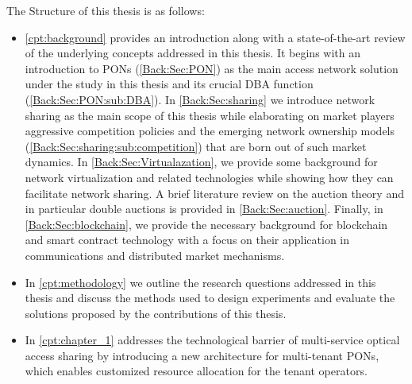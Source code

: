 The Structure of this thesis is as follows:
    \begin{itemize}
    \item \autoref{cpt:background} provides an introduction along with a state-of-the-art review of the underlying concepts addressed in this thesis. It begins with an introduction to \acp{PON} (\autoref{Back:Sec:PON}) as the main access network solution under the study in this thesis and its crucial \ac{DBA} function (\autoref{Back:Sec:PON:sub:DBA}). In \autoref{Back:Sec:sharing} we introduce network sharing as the main scope of this thesis while elaborating on market players aggressive competition policies and the emerging network ownership models (\autoref{Back:Sec:sharing:sub:competition}) that are born out of such market dynamics. 
    In \autoref{Back:Sec:Virtualazation}, we provide some background for network virtualization and related technologies while showing how they can facilitate network sharing. A brief literature review on the auction theory and in particular double auctions is provided in \autoref{Back:Sec:auction}. Finally, in \autoref{Back:Sec:blockchain}, we provide the necessary background for blockchain and smart contract technology with a focus on their application in communications and distributed market mechanisms. 
    
    \item In \autoref{cpt:methodology} we outline the research questions addressed in this thesis and discuss the methods used to design experiments and evaluate the solutions proposed by the contributions of this thesis. 
    
    \item In \autoref{cpt:chapter_1} addresses the technological barrier of multi-service optical access sharing by introducing a new architecture for multi-tenant \acp{PON}, which enables customized resource allocation for the tenant operators.
    

\end{itemize}
